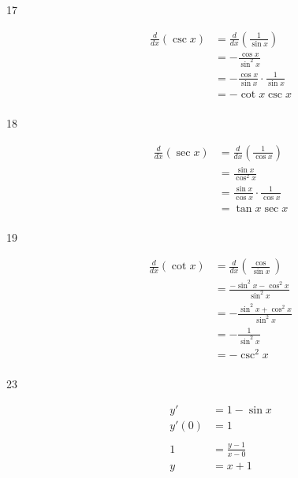 \documentclass[letterpaper, landscape]{exam}
\begin{document}
\begin{description}
    \item[17] 
      \begin{align*}
          \frac{d}{dx} (\csc x) & = \frac{d}{dx} \left( \frac{1}{\sin x} \right) \\
                                & = - \frac{\cos x}{\sin^2 x} \\
                                & = - \frac{\cos x}{\sin x} \cdot \frac{1}{\sin x} \\
                                & = - \cot x \csc x \\
      \end{align*}

    \item[18] 
      \begin{align*}
          \frac{d}{dx} (\sec x) & = \frac{d}{dx} \left( \frac{1}{\cos x} \right) \\
                                & = \frac{\sin x}{\cos^2 x} \\
                                & = \frac{\sin x}{\cos x} \cdot \frac{1}{\cos x} \\
                                & = \tan x \sec x \\
      \end{align*}

    \item[19] 
      \begin{align*}
          \frac{d}{dx} (\cot x) & = \frac{d}{dx} \left( \frac{\cos}{\sin x} \right) \\
                                & = \frac{- \sin^2 x - \cos^2 x}{\sin^2 x} \\
                                & = - \frac{\sin^2 x + \cos^2 x}{\sin^2 x} \\
                                & = - \frac{1}{\sin^2 x} \\
                                & = - \csc^2 x \\
      \end{align*}

    \item[23] 
      \begin{align*}
        y'    & = 1 - \sin x \\
        y'(0) & = 1 \\
        \\
        1     & = \frac{y - 1}{x - 0} \\
        y     & = x + 1 \\
      \end{align*}


\end{description}
\end{document}
